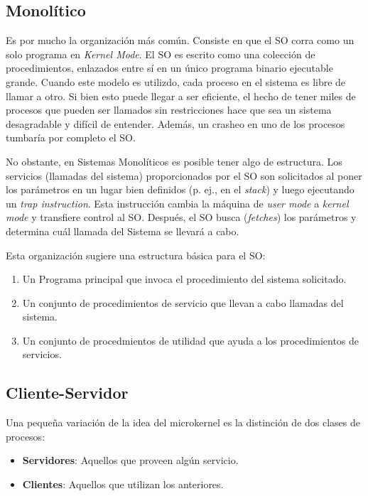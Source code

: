 \documentclass[12pt, a4paper]{article} %
\begin{document}
\subsection{Monolítico}

Es por mucho la organización más común. Consiste en que el SO corra como un solo programa en \textit{Kernel Mode}. El SO es escrito como una colección de procedimientos, enlazados entre sí en un único programa binario ejecutable grande. Cuando este modelo es utilizdo, cada proceso en el sistema es libre de llamar a otro. Si bien esto puede llegar a ser eficiente, el hecho de tener miles de procesos que pueden ser llamados sin restricciones hace que sea un sistema desagradable y difícil de entender. Además, un crasheo en uno de los procesos tumbaría por completo el SO.

No obstante, en Sistemas Monolíticos es posible tener algo de estructura. Los servicios (llamadas del sistema) proporcionados por el SO son solicitados al poner los parámetros en un lugar bien definidos (p. ej., en el \textit{stack}) y luego ejecutando un \textit{trap instruction}. Esta instrucción cambia la máquina de \textit{user mode} a \textit{kernel mode} y transfiere control al SO. Después, el SO busca (\textit{fetches}) los parámetros y determina cuál llamada del Sistema se llevará a cabo.

Esta organización sugiere una estructura básica para el SO:

\begin{enumerate}
	\item Un Programa principal que invoca el procedimiento del sistema solicitado.
	\item Un conjunto de procedimientos de servicio que llevan a cabo llamadas del sistema.
	\item Un conjunto de procedmientos de utilidad que ayuda a los procedimientos de servicios.
\end{enumerate}

\subsection{Cliente-Servidor}

Una pequeña variación de la idea del microkernel es la distinción de dos clases de procesos:

\begin{itemize}
	\item \textbf{Servidores}: Aquellos que proveen algún servicio.
	\item \textbf{Clientes}: Aquellos que utilizan los anteriores.
\end{itemize}
\end{document}
